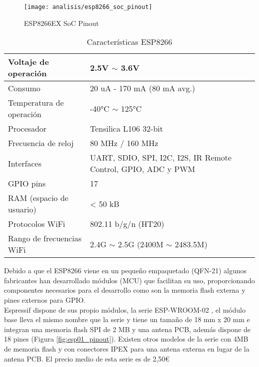 \documentclass[../proyecto.tex]{subfiles}
\begin{document}
\begin{figure}[H]
\centering
\texttt{[image: analisis/esp8266\_soc\_pinout]}
\caption{ESP8266EX SoC Pinout}
\label{fig:esp8266_soc_pinout}
\end{figure}

\begin{table}[!h]
\centering
\begin{tabular}{ |l|m{20em}| }
\hline
Voltaje de operación      & 2.5V $\sim$ 3.6V          \\ \hline
Consumo                   & 20 uA - 170 mA (80 mA avg.)  \\ \hline
Temperatura de operación  & -40°C $\sim$ 125°C        \\ \hline
Procesador                & Tensilica L106 32-bit     \\ \hline
Frecuencia de reloj       & 80 MHz / 160 MHz          \\ \hline
Interfaces                & UART, SDIO, SPI, I2C, I2S, IR Remote Control, GPIO, ADC y PWM                           \\ \hline
GPIO pins                 & 17                        \\ \hline
RAM (espacio de usuario)  & < 50 kB                     \\ \hline
Protocolos WiFi           & 802.11 b/g/n (HT20)       \\ \hline
Rango de frecuencias WiFi & 2.4G $\sim$ 2.5G (2400M $\sim$ 2483.5M) \\ \hline
\end{tabular}
\caption{Características ESP8266}
\label{table:caracteristicas_esp8266}
\end{table}

Debido a que el ESP8266 viene en un pequeño empaquetado (QFN-21) algunos fabricantes han desarrollado módulos (MCU) que facilitan su uso, proporcionando componentes necesarios para el desarrollo como son la memoria flash externa y pines externos para GPIO.\\

Espressif dispone de sus propio módulos, la serie ESP-WROOM-02 \cite{espwroom02_overview}, el módulo base \cite{espwroom02_datasheet} lleva el mismo nombre que la serie y tiene un tamaño de 18 mm x 20 mm e integran una memoria flash SPI de 2 MB y una antena PCB, además dispone de 18 pines (Figura \ref{fig:esp01_pinout}). Existen otros modelos de la serie con 4MB de memoria flash y con conectores IPEX para una antena externa en lugar de la antena PCB. El precio medio de esta serie es de 2,50€ \cite{espressif_provider_digikey} \cite{espressif_provider_mouser}\\
\end{document}

